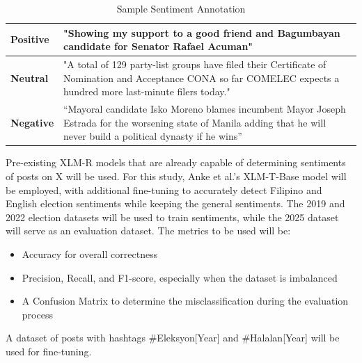 \begin{table}[h]
    \renewcommand{\arraystretch}{1.8}

    \caption{Sample Sentiment Annotation}
    \centering
    \begin{tabularx}{\textwidth}{>{\centering\arraybackslash}p{4cm}|>{\centering\arraybackslash}p{10cm}}
        \textbf{Positive} & "Showing my support to a good friend and Bagumbayan candidate for Senator Rafael Acuman" \\
        \hline
        \textbf{Neutral} & "A total of 129 party-list groups have filed their Certificate of Nomination and Acceptance CONA so far COMELEC expects a hundred more last-minute filers today." \\
        \hline
        \textbf{Negative} & “Mayoral candidate Isko Moreno blames incumbent Mayor Joseph Estrada for the worsening state of Manila adding that he will never build a political dynasty if he wins” \\
    \end{tabularx}
\end{table}

Pre-existing XLM-R models that are already capable of determining sentiments of posts on X will be used. For this study, Anke et al.’s \cite{Barbieri-2022} XLM-T-Base model will be employed, with additional fine-tuning to accurately detect Filipino and English election sentiments while keeping the general sentiments. The 2019 and 2022 election datasets will be used to train sentiments, while the 2025 dataset will serve as an evaluation dataset. The metrics to be used will be:
\begin{itemize}
    \item Accuracy for overall correctness
    \item Precision, Recall, and F1-score, especially when the dataset is imbalanced 
    \item A Confusion Matrix to determine the misclassification during the evaluation process
\end{itemize}

A dataset of posts with hashtags \#Eleksyon[Year] and \#Halalan[Year] will be used for fine-tuning.

